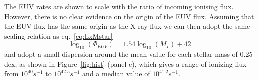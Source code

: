 \documentclass[fleqn,usenatbib,letters]{mnras}
\begin{document}
The EUV rates are shown to scale with the ratio of incoming ionising flux. However, there is no clear evidence on the origin of the EUV flux. Assuming that the EUV flux has the same origin as the X-ray flux we can then adopt the same scaling relation as eq.~\ref{eq:LxMstar}
\begin{equation} \label{eq:PhiEUVMstar}
    \log_{10}(\Phi_{EUV}) = 1.54 \log_{10}(M_\star) + 42 \,
\end{equation}
and adopt a small dispersion around the mean value for each stellar mass of 0.25 dex, as shown in Figure~\ref{fig:hist} (panel c), which gives a range of ionizing flux from $10^{40} s^{-1}$ to $10^{42.5} s^{-1}$ and a median value of $10^{41.2} s^{-1}$.
\end{document}

